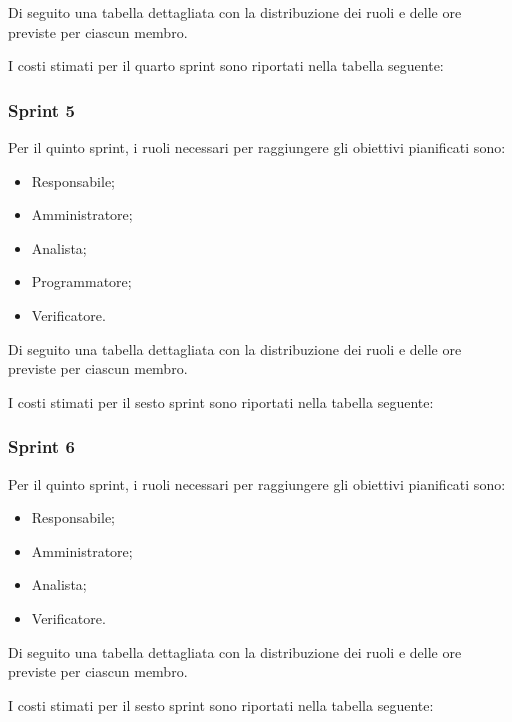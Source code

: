 \newpage
Di seguito una tabella dettagliata con la distribuzione dei ruoli e delle ore previste per ciascun membro.



I costi stimati per il quarto sprint sono riportati nella tabella seguente:



\subsubsection{Sprint 5}
Per il quinto sprint, i ruoli necessari per raggiungere gli obiettivi pianificati sono:
\begin{itemize}
    \item Responsabile;
    \item Amministratore;
    \item Analista;
    \item Programmatore;
    \item Verificatore.
\end{itemize}

\newpage
Di seguito una tabella dettagliata con la distribuzione dei ruoli e delle ore previste per ciascun membro.



I costi stimati per il sesto sprint sono riportati nella tabella seguente:



\subsubsection{Sprint 6}
Per il quinto sprint, i ruoli necessari per raggiungere gli obiettivi pianificati sono:
\begin{itemize}
    \item Responsabile;
    \item Amministratore;
    \item Analista;
    \item Verificatore.
\end{itemize}

\newpage
Di seguito una tabella dettagliata con la distribuzione dei ruoli e delle ore previste per ciascun membro.



I costi stimati per il sesto sprint sono riportati nella tabella seguente:

